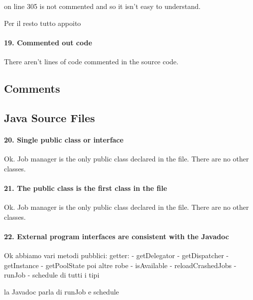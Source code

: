 \documentclass[english]{article}
\begin{document}
 on line 305 is not commented and so it isn't easy to understand.

Per il resto tutto appoito

\paragraph{19. Commented out code}

There aren't lines of code commented in the source code.\subsection{Comments}

\subsection{Java Source Files}
\paragraph{20. Single public class or interface}
Ok.
Job manager is the only public class declared in the file.
There are no other classes.

\paragraph{21. The public class is the first class in the file}
Ok.
Job manager is the only public class declared in the file.
There are no other classes.

\paragraph{22. External program interfaces are consistent with the Javadoc}
Ok
abbiamo vari metodi pubblici:
getter:
- getDelegator
- getDispatcher
- getInstance
- getPoolState
poi altre robe
- isAvailable
- reloadCrashedJobs
- runJob
- schedule di tutti i tipi

la Javadoc parla di runJob e schedule
\end{document}
